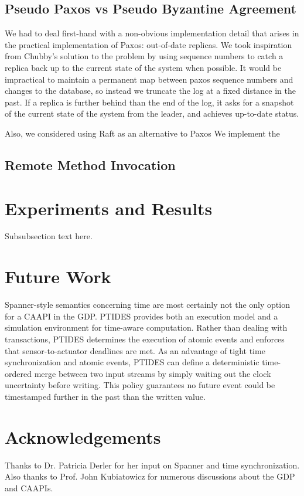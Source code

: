 \documentclass[10pt,twocolumn]{article}
\begin{document}
\subsection{Pseudo Paxos vs Pseudo Byzantine Agreement}

We had to deal first-hand with a non-obvious implementation detail that arises in the practical implementation of Paxos: out-of-date replicas. We took inspiration from Chubby's solution to the problem  \cite{chandra_paxos_2007} by using sequence numbers to catch a replica back up to the current state of the system when possible. It would be impractical to maintain a permanent map between paxos sequence numbers and changes to the database, so instead we truncate the log at a fixed distance in the past. If a replica is further behind than the end of the log, it asks for a snapshot of the current state of the system from the leader, and achieves up-to-date status.
  
Also, we considered using Raft \cite{ongaro_search_2014} as an alternative to Paxos
We implement the 

\subsection{Remote Method Invocation}

\section{Experiments and Results}
Subsubsection text here.

\section{Future Work}

Spanner-style semantics concerning time are most certainly not the only option for a CAAPI in the GDP. PTIDES \cite{zou_execution_2009} provides both an execution model and a simulation environment for time-aware computation. Rather than dealing with transactions, PTIDES determines the execution of atomic events and enforces that sensor-to-actuator deadlines are met. As an advantage of tight time synchronization and atomic events, PTIDES can define a deterministic time-ordered merge between two input streams by simply waiting out the clock uncertainty before writing. This policy guarantees no future event could be timestamped further in the past than the written value.







\section{Acknowledgements}
Thanks to Dr. Patricia Derler for her input on Spanner and time synchronization. Also thanks to Prof. John Kubiatowicz for numerous discussions about the GDP and CAAPIs.



\end{document}
